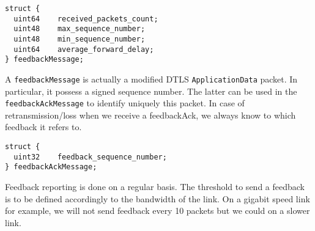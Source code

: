 
\begin{lstlisting}[caption= Feedback message structure, label=lst:feedbackM]
struct {
  uint64    received_packets_count;
  uint48    max_sequence_number;
  uint48    min_sequence_number;
  uint64    average_forward_delay;
} feedbackMessage;
\end{lstlisting}

A \verb!feedbackMessage! is actually a modified DTLS \verb!ApplicationData! packet. In particular, it possess a signed sequence number. The latter can be used in the \verb!feedbackAckMessage! to identify uniquely this packet. In case of retransmission/loss when we receive a feedbackAck, we always know to which feedback it refers to.

\begin{lstlisting}[caption = Feedback Ack structure, label=lst:feedbackA]
struct {
  uint32    feedback_sequence_number;
} feedbackAckMessage;
\end{lstlisting}

Feedback reporting is done on a regular basis. The threshold to send a feedback is to be defined accordingly to the bandwidth of the link. On a gigabit speed link for example, we will not send feedback every 10 packets but we could on a slower link.